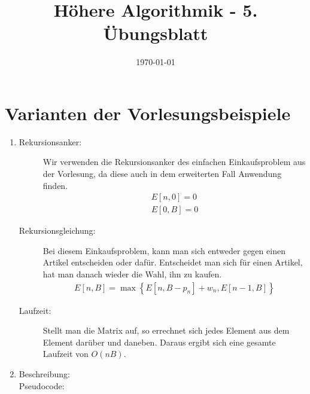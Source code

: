 \documentclass[a4paper,10pt]{article}
\title{H\"ohere Algorithmik - 5. \"Ubungsblatt}
\author{\Authors}
\date{\today}
\begin{document}
\maketitle

\section{Varianten der Vorlesungsbeispiele}
\begin{enumerate}
	\item \begin{description}
		\item[Rekursionsanker:] Wir verwenden die Rekursionsanker des einfachen Einkaufsproblem aus der Vorlesung, da diese auch in dem erweiterten Fall Anwendung finden.\begin{align*}
			E[n, 0] = 0\\
			E[0, B] = 0
		\end{align*}
		\item[Rekursionsgleichung:] Bei diesem Einkaufsproblem, kann man sich entweder gegen einen Artikel entscheiden oder dafür. Entscheidet man sich für einen Artikel, hat man danach wieder die Wahl, ihn zu kaufen.\begin{align*}
			E[n, B] = \max\left\{E[n, B-p_n] + w_n, E[n-1, B]\right\}
		\end{align*}
		\item[Laufzeit:] Stellt man die Matrix auf, so errechnet sich jedes Element aus dem Element darüber und daneben. Daraus ergibt sich eine gesamte Laufzeit von $O(nB)$.
	\end{description}
	\item \begin{description}
		\item[Beschreibung:]
		\item[Pseudocode:]
	\end{description}
\end{enumerate}
\end{document}
